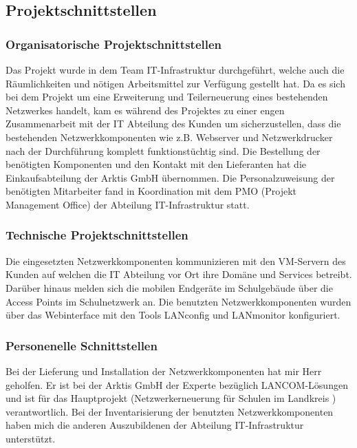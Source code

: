 \subsection{Projektschnittstellen} 
\label{sec:Projektschnittstellen}
\subsubsection{Organisatorische Projektschnittstellen}
Das Projekt wurde in dem Team IT-Infrastruktur durchgeführt, welche auch die Räumlichkeiten und nötigen Arbeitsmittel zur Verfügung gestellt hat. 
Da es sich bei dem Projekt um eine Erweiterung und Teilerneuerung eines bestehenden Netzwerkes handelt, kam es während des Projektes zu einer engen Zusammenarbeit mit der IT Abteilung des Kunden um sicherzustellen, dass die bestehenden Netzwerkkomponenten wie z.B. Webserver und Netzwerkdrucker nach der Durchführung komplett funktionstüchtig sind. 
Die Bestellung der benötigten Komponenten und den Kontakt mit den Lieferanten hat die Einkaufsabteilung der Arktis GmbH übernommen. 
Die Personalzuweisung der benötigten Mitarbeiter fand in Koordination mit dem PMO (Projekt Management Office) der Abteilung IT-Infrastruktur statt.    
\subsubsection{Technische Projektschnittstellen}
Die eingesetzten Netzwerkkomponenten kommunizieren mit den VM-Servern des Kunden auf welchen die IT Abteilung vor Ort ihre Domäne und Services betreibt. 
Darüber hinaus melden sich die mobilen Endgeräte im Schulgebäude über die Access Points im Schulnetzwerk an. 
Die benutzten Netzwerkkomponenten wurden über das Webinterface mit den Tools LANconfig und LANmonitor konfiguriert.
\subsubsection{Personenelle Schnittstellen}
Bei der Lieferung und Installation der Netzwerkkomponenten hat mir Herr  geholfen. 
Er ist bei der Arktis GmbH der Experte bezüglich LANCOM-Lösungen und ist für das Hauptprojekt (Netzwerkerneuerung für Schulen im Landkreis ) verantwortlich. 
Bei der Inventarisierung der benutzten Netzwerkkomponenten haben mich die anderen Auszubildenen der Abteilung IT-Infrastruktur unterstützt. 
\begin{comment}
	\item Mit welchen anderen Systemen interagiert die Anwendung (technische Schnittstellen)?
	\item Wer genehmigt das Projekt \bzw stellt Mittel zur Verfügung? 
	\item Wer sind die Benutzer der Anwendung?
	\item Wem muss das Ergebnis präsentiert werden?
\end{comment}


